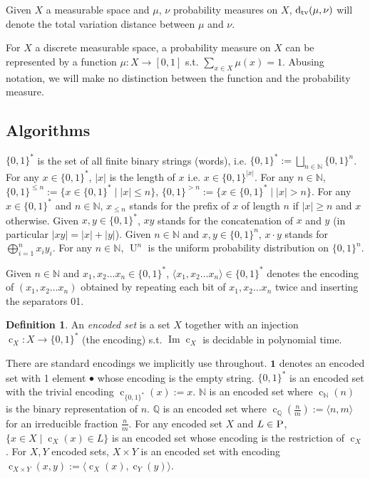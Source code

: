 \documentclass{article}
\numberwithin{equation}{section}
\theoremstyle{definition}
\newtheorem{definition}{Definition}[section]
\theoremstyle{plain}
\newcommand{\Bool}{\{0,1\}}
\newcommand{\Words}{{\Bool^*}}
\newcommand{\WordsLen}[1]{{\Bool^{#1}}}
\DeclareMathOperator{\Img}{Im}
\DeclareMathOperator{\U}{U}
\DeclareMathOperator{\En}{c}
\newcommand{\Dtv}{\operatorname{d}_{\textnormal{tv}}}
\newcommand{\Nats}{\mathbb{N}}
\newcommand{\Rats}{\mathbb{Q}}
\newcommand{\Abs}[1]{\lvert #1 \rvert}
\newcommand{\Chev}[1]{\langle #1 \rangle}
\begin{document}
Given $X$ a measurable space and $\mu$, $\nu$ probability measures on $X$, $\Dtv(\mu,\nu)$ will denote the total variation distance between $\mu$ and $\nu$.

For $X$ a discrete measurable space, a probability measure on $X$ can be represented by a function $\mu: X \rightarrow [0,1]$ s.t. $\sum_{x \in X} \mu(x) = 1$. Abusing notation, we will make no distinction between the function and the probability measure.

\subsection{Algorithms}

$\Words$ is the set of all finite binary strings (words), i.e. $\Words:=\bigsqcup_{n \in \Nats} \Bool^n$. For any $x \in \Words$, $\Abs{x}$ is the length of $x$ i.e. $x \in \WordsLen{\Abs{x}}$. For any $n \in \Nats$, $\Bool^{\leq n}:=\{x \in \Words \mid \Abs{x} \leq n\}$, $\Bool^{>n}:=\{x \in \Words \mid \Abs{x} > n\}$. For any $x \in \Words$ and $n \in \Nats$, $x_{\leq n}$ stands for the prefix of $x$ of length $n$ if $\Abs{x} \geq n$ and $x$ otherwise. Given $x,y \in \Words$, $xy$ stands for the concatenation of $x$ and $y$ (in particular $\Abs{xy}=\Abs{x}+\Abs{y}$). Given $n \in \Nats$ and $x,y \in \WordsLen{n}$, $x \cdot y$ stands for $\bigoplus_{i=1}^n x_i y_i$. For any $n \in \Nats$, $\U^n$ is the uniform probability distribution on $\WordsLen{n}$.

Given $n \in \Nats$ and ${x_1, x_2 \ldots x_n \in \Words}$, $\Chev{x_1,x_2 \ldots x_n} \in \Words$ denotes the encoding of $(x_1,x_2 \ldots x_n)$ obtained by repeating each bit of $x_1, x_2 \ldots x_n$ twice and inserting the separators 01.
\begin{definition}

An \emph{encoded set} is a set $X$ together with an injection ${\En_X: X \rightarrow \Words}$ (the encoding) s.t. $\Img \En_X$ is decidable in polynomial time.

\end{definition}

There are standard encodings we implicitly use throughout. $\bm{1}$ denotes an encoded set with 1 element $\bullet$ whose encoding is the empty string. $\Words$ is an encoded set with the trivial encoding ${\En_\Words(x):=x}$. $\Nats$ is an encoded set where $\En_\Nats(n)$ is the binary representation of $n$. $\Rats$ is an encoded set where ${\En_\Rats(\frac{n}{m}):=\Chev{n,m}}$ for an irreducible fraction $\frac{n}{m}$. For any encoded set $X$ and $L \in \textsc{P}$, $\{x \in X \mid \En_X(x) \in L\}$ is an encoded set whose encoding is the restriction of $\En_X$. For $X,Y$ encoded sets, $X \times Y$ is an encoded set with encoding $\En_{X \times Y}(x,y):=\Chev{\En_X(x),\En_Y(y)}$.
\end{document}
